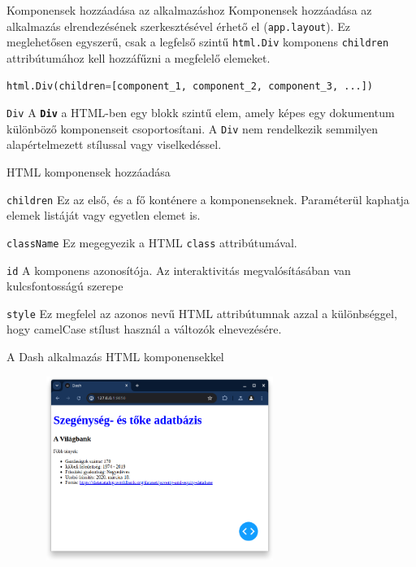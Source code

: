\documentclass[english, aspectratio=169]{beamer}
\begin{document}
\begin{frame}[fragile]{Komponensek hozzáadása az alkalmazáshoz}
	Komponensek hozzáadása az alkalmazás elrendezésének szerkesztésével érhető el (\texttt{app.layout}). Ez meglehetősen egyszerű, csak a legfelső szintű \texttt{html.Div} komponens \texttt{children} attribútumához kell hozzáfűzni a megfelelő elemeket.\par\smallskip
	\begin{lstlisting}[language=python]
html.Div(children=[component_1, component_2, component_3, ...])
	\end{lstlisting}
	\par\smallskip
	\begin{block}{\texttt{Div}}
		A \textbf{\texttt{Div}} a HTML-ben egy blokk szintű elem, amely képes egy dokumentum különböző komponenseit csoportosítani. A \texttt{Div} nem rendelkezik semmilyen alapértelmezett stílussal vagy viselkedéssel.
	\end{block}
\end{frame}

\begin{frame}[fragile]{HTML komponensek hozzáadása}
	\begin{block}{\texttt{children}}
		Ez az első, és a fő konténere a komponenseknek. Paraméterül kaphatja elemek listáját vagy egyetlen elemet is.
	\end{block}
	\begin{block}{\texttt{className}}
		Ez megegyezik a HTML \texttt{class} attribútumával.
	\end{block}
	\begin{block}{\texttt{id}}
		A komponens azonosítója. Az interaktivitás megvalósításában van kulcsfontosságú szerepe
	\end{block}
	\begin{block}{\texttt{style}}
		Ez megfelel az azonos nevű HTML attribútumnak azzal a különbséggel, hogy camelCase stílust használ a változók elnevezésére.
	\end{block}
\end{frame}

\begin{frame}{A Dash alkalmazás HTML komponensekkel}
	\begin{center}
		\includegraphics[width=10cm, height=6cm, keepaspectratio]{images/dash_6.png}
	\end{center}
\end{frame}
\end{document}
